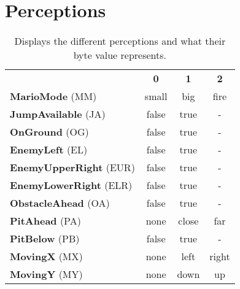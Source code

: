 

\setcounter{table}{0}
\renewcommand\thetable{\thesection\arabic{table}}
\setcounter{figure}{0}
\renewcommand\thefigure{\thesection\arabic{figure}}
\setcounter{lstlisting}{0}
\renewcommand\thelstlisting{\thesection\arabic{lstlisting}}


\section{Perceptions}
\label{app:percond}

\vspace{-1\baselineskip}
\begin{table}[h]
  \begin{center} \footnotesize
    \begin{tabular}{ l c c c}
    & \textbf{0} & \textbf{1} & \textbf{2} \\
    \textbf{MarioMode} (MM) & small & big & fire \\
    \textbf{JumpAvailable} (JA) & false & true & -  \\
    \textbf{OnGround} (OG) & false & true & -  \\
    \textbf{EnemyLeft} (EL) & false & true & -  \\
    \textbf{EnemyUpperRight} (EUR) & false & true & -  \\
    \textbf{EnemyLowerRight} (ELR) & false & true & -  \\
    \textbf{ObstacleAhead} (OA) & false & true & -  \\
    \textbf{PitAhead} (PA) & none & close & far \\
    \textbf{PitBelow} (PB) & false & true & -  \\
    \textbf{MovingX} (MX) & none & left & right \\
    \textbf{MovingY} (MY) & none & down & up \\
    \end{tabular}
    \end{center}
  \caption{Displays the different perceptions and what their byte value represents.}
  \label{tab:AgKey}
\end{table}

